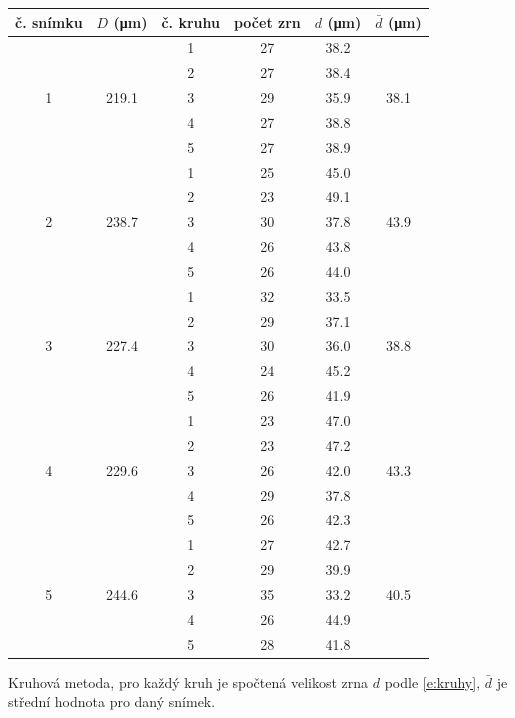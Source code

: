 \begin{tabulka}[htbp]
\centering
\begin{tabular}{c||ccc|c|c}
č. snímku & $D$ (\si{\um}) & č. kruhu & počet zrn & $d$ (\si{\um}) & $\bar{d}$ (\si{\um}) \\
\hline\hline
\multirow{5}{*}{1} & \multirow{5}{*}{219.1} & 1 & 27 & 38.2 & \multirow{5}{*}{38.1} \\ 
 &  & 2 & 27 & 38.4 &  \\ 
 &  & 3 & 29 & 35.9 &  \\ 
 &  & 4 & 27 & 38.8 &  \\ 
 &  & 5 & 27 & 38.9 &  \\ \hline
\multirow{5}{*}{2} & \multirow{5}{*}{238.7} & 1 & 25 & 45.0 & \multirow{5}{*}{43.9} \\ 
 &  & 2 & 23 & 49.1 &  \\ 
 &  & 3 & 30 & 37.8 &  \\ 
 &  & 4 & 26 & 43.8 &  \\ 
 &  & 5 & 26 & 44.0 &  \\ \hline
\multirow{5}{*}{3} & \multirow{5}{*}{227.4} & 1 & 32 & 33.5 & \multirow{5}{*}{38.8} \\ 
 &  & 2 & 29 & 37.1 &  \\ 
 &  & 3 & 30 & 36.0 &  \\ 
 &  & 4 & 24 & 45.2 &  \\ 
 &  & 5 & 26 & 41.9 &  \\ \hline
\multirow{5}{*}{4} & \multirow{5}{*}{229.6} & 1 & 23 & 47.0 & \multirow{5}{*}{43.3} \\ 
 &  & 2 & 23 & 47.2 &  \\ 
 &  & 3 & 26 & 42.0 &  \\ 
 &  & 4 & 29 & 37.8 &  \\ 
 &  & 5 & 26 & 42.3 &  \\ \hline
\multirow{5}{*}{5} & \multirow{5}{*}{244.6} & 1 & 27 & 42.7 & \multirow{5}{*}{40.5} \\ 
 &  & 2 & 29 & 39.9 &  \\ 
 &  & 3 & 35 & 33.2 &  \\ 
 &  & 4 & 26 & 44.9 &  \\ 
 &  & 5 & 28 & 41.8 &  \\ 


\end{tabular}
\caption{Kruhová metoda, pro každý kruh je spočtená velikost zrna $d$ podle \eqref{e:kruhy}, $\bar{d}$ je střední hodnota pro daný snímek.}
\label{t:kruhy}
\end{tabulka}

